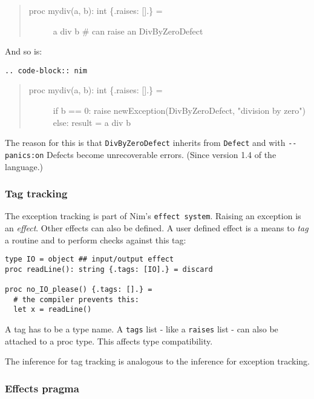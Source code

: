 \begin{quote}
\begin{description}
\item[proc mydiv(a, b): int \{.raises: {[}{]}.\} =]
a div b \# can raise an DivByZeroDefect
\end{description}
\end{quote}

And so is:

\begin{verbatim}
.. code-block:: nim
\end{verbatim}

\begin{quote}
\begin{description}
\item[proc mydiv(a, b): int \{.raises: {[}{]}.\} =]
if b == 0: raise newException(DivByZeroDefect, "division by zero") else:
result = a div b
\end{description}
\end{quote}

The reason for this is that \texttt{DivByZeroDefect} inherits from
\texttt{Defect} and with \texttt{-\/-panics:on} Defects become
unrecoverable errors. (Since version 1.4 of the language.)

\hypertarget{tag-tracking}{%
\subsubsection{Tag tracking}\label{tag-tracking}}

The exception tracking is part of Nim's \texttt{effect\ system}. Raising
an exception is an \emph{effect}. Other effects can also be defined. A
user defined effect is a means to \emph{tag} a routine and to perform
checks against this tag:

\begin{verbatim}
type IO = object ## input/output effect
proc readLine(): string {.tags: [IO].} = discard

proc no_IO_please() {.tags: [].} =
  # the compiler prevents this:
  let x = readLine()
\end{verbatim}

A tag has to be a type name. A \texttt{tags} list - like a
\texttt{raises} list - can also be attached to a proc type. This affects
type compatibility.

The inference for tag tracking is analogous to the inference for
exception tracking.

\hypertarget{effects-pragma}{%
\subsubsection{Effects pragma}\label{effects-pragma}}

